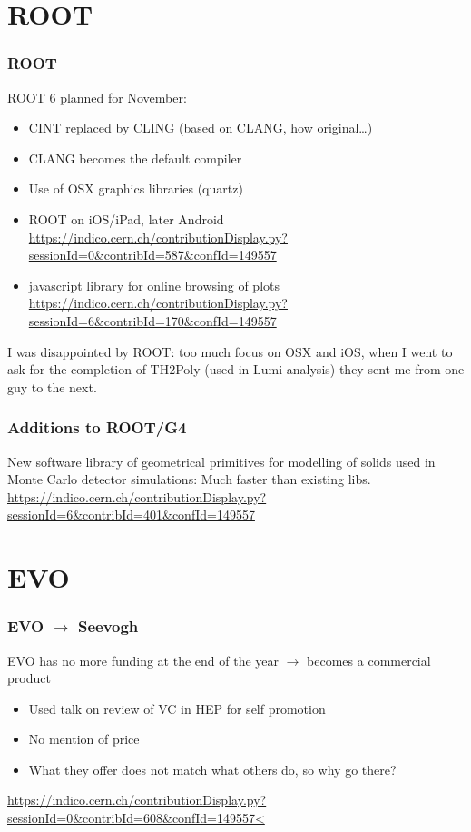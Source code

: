 \documentclass[handout]{beamer}
\begin{document}
\section{ROOT}
\begin{frame}
\frametitle{ROOT}
ROOT 6 planned for November:
\begin{itemize}
  \item CINT replaced by CLING (based on CLANG, how original\ldots)
  \item CLANG becomes the default compiler
  \item Use of OSX graphics libraries (quartz)
  \item ROOT on iOS/iPad, later Android
  {\tiny
  \url{https://indico.cern.ch/contributionDisplay.py?sessionId=0&contribId=587&confId=149557}}
  \item javascript library for online browsing of plots 
  {\tiny
  \url{https://indico.cern.ch/contributionDisplay.py?sessionId=6&contribId=170&confId=149557}}
\end{itemize}
I was disappointed by ROOT: too much focus on OSX and iOS, when I went to ask
for the completion of TH2Poly (used in Lumi analysis) they sent me from one guy to
the next.
\end{frame}

\begin{frame}
\frametitle{Additions to ROOT/G4}
New software library of geometrical primitives for modelling of solids used in
Monte Carlo detector simulations: Much faster than existing libs.\\
{\tiny
\url{https://indico.cern.ch/contributionDisplay.py?sessionId=6&contribId=401&confId=149557}}
\end{frame}

\section{EVO}
\begin{frame}
\frametitle{EVO $\to$ Seevogh}
EVO has no more funding at the end of the year $\to$ becomes a commercial
product
\begin{itemize}
  \item Used talk on review of VC in HEP for self promotion
  \item No mention of price
  \item What they offer does not match what others do, so why go there?
\end{itemize}
{\tiny
\url{https://indico.cern.ch/contributionDisplay.py?sessionId=0&contribId=608&confId=149557<}}
\end{frame}
\end{document}
